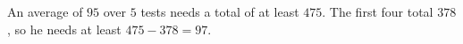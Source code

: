 An average of $95$ over $5$ tests needs a total of at least $475$. The first four total $378$, so he needs at least $475-378=\boxed{97}$.
